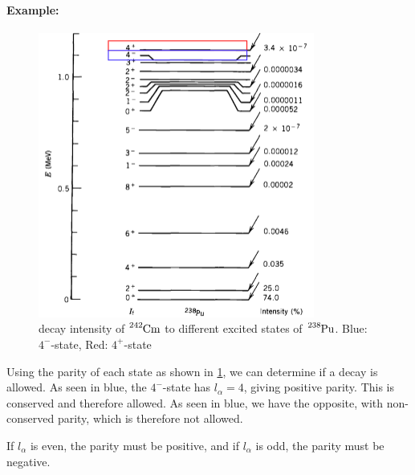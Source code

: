 \paragraph{Example:}
\begin{figure}
\vspace{-5mm}
\centering
\includegraphics[width = .45\textwidth]{decay_intensity_by_state.png}
\caption{decay intensity of $\ce{_{}^{242}\text{Cm}_{}}$ to different excited states of $\ce{_{}^{238}\text{Pu}_{}}$. Blue: $4^{-}$-state, Red: $4^{+}$-state}
\label{fig: decay_intensity_by_state}
\end{figure}


Using the parity of each state as shown in \cref{fig: decay_intensity_by_state}, we can determine if a decay is allowed. As seen in blue, the $4^{-}$-state has $l_{α} = 4$, giving positive parity. This is conserved and therefore allowed. As seen in blue, we have the opposite, with non-conserved parity, which is therefore not allowed. 

If $l_{α}$ is even, the parity must be positive, and if $l_{α}$ is odd, the parity must be negative.

\vspace{40mm}